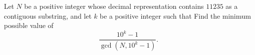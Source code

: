 Let $N$ be a positive integer whose decimal representation contains $11235$ as a contiguous substring, and let $k$ be a positive integer such that   Find the minimum possible value of \[\dfrac{10^k-1}{\gcd(N,10^k-1)}.\]